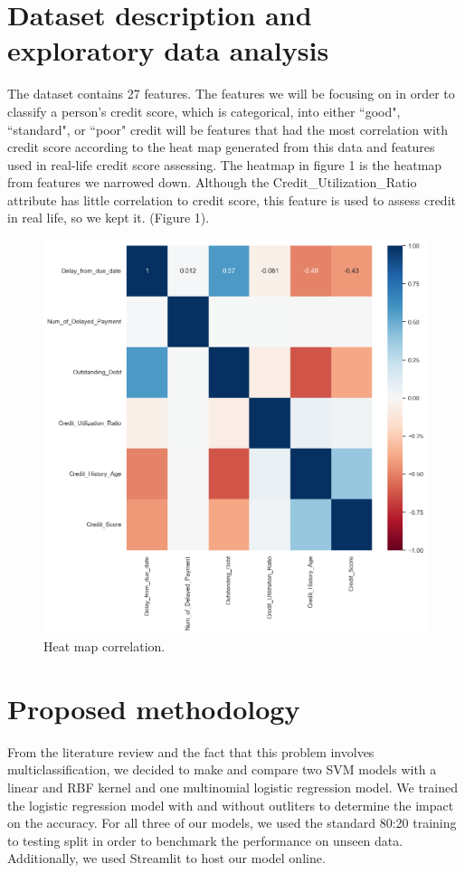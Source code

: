\documentclass[conference, 11pt]{IEEEtran}
\begin{document}
\section{Dataset description and exploratory data analysis}
The dataset contains 27 features. The features we will be focusing on in order
to classify a person's credit score, which is categorical, into either ``good", ``standard", or ``poor" credit
will be features that had the most correlation with credit score according to the heat map
generated from this data and features used in real-life credit score assessing. The heatmap in figure 
1 is the heatmap from features we narrowed down. Although the Credit\_Utilization\_Ratio attribute has little 
correlation to credit score, this feature is used to assess credit in real life, so we kept it. (Figure 1).
\begin{figure}[h]
    \begin{center}
    \includegraphics[width=\columnwidth]{images/credscoreheatmap.png}
    \caption{Heat map correlation.}
    \label{fig:figure1}
    \end{center}
\end{figure}
\section{Proposed methodology}
From the literature review and the fact that this problem involves multiclassification,
we decided to make and compare two SVM models with a linear and RBF kernel and one 
multinomial logistic regression model. We trained the logistic regression model with and without
outliters to determine the impact on the accuracy. For all three of our models, we used
the standard 80:20 training to testing split in order to benchmark the performance on unseen
data. Additionally, we used Streamlit to host our model online.
\end{document}
